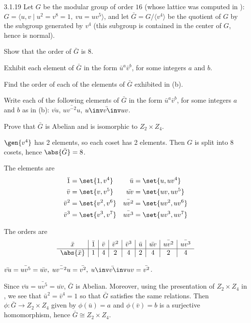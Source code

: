 \begin{exercise}{3.1.19}
    Let $G$ be the modular group of order $16$ (whose lattice was computed in ): $G = \langle u,v \mid u^2 = v^8 = 1,\ vu = uv^5 \rangle$, and let $\bar{G} = G/\langle v^4 \rangle$ be the quotient of $G$ by the subgroup generated by $v^4$ (this subgroup is contained in the center of $G$, hence is normal).
    \begin{subexercises}
        \item Show that the order of $\bar{G}$ is $8$.
        \item Exhibit each element of $\bar{G}$ in the form $\bar{u}^a \bar{v}^b$, for some integers $a$ and $b$.
        \item Find the order of each of the elements of $\bar{G}$ exhibited in (b).
        \item Write each of the following elements of $\bar{G}$ in the form $\bar{u}^a \bar{v}^b$, for some integers $a$ and $b$ as in (b): $\bar{vu}$, $\bar{uv^{-2}u}$, $\bar{u\inv v\inv uv}$.
        \item Prove that $\bar{G}$ is Abelian and is isomorphic to $Z_2 \times Z_4$.
    \end{subexercises}
\end{exercise}

\begin{solenum}
    \item $\gen{v^4}$ has 2 elements, so each coset has 2 elements.
	Then $G$ is split into 8 cosets, hence $\abs{\bar G} = 8$.
    \item The elements are
    \begin{align*}
        \bar 1 & = \set{1, v^4} & \bar u & = \set{u, uv^4} \\
        \bar v & = \set{v, v^5} & \bar{uv} & = \set{uv, uv^5} \\
        \bar v^2 & = \set{v^2, v^6} & \bar{uv^2} & = \set{uv^2, uv^6} \\
        \bar v^3 & = \set{v^3, v^7} & \bar{uv^3} & = \set{uv^3, uv^7}
    \end{align*}
    \item The orders are
    \[
        \begin{array}{c|c|c|c|c|c|c|c|c}
            \bar x & \bar 1 & \bar v & \bar v^2 & \bar v^3 & \bar u & \bar{uv} & \bar{uv^2} & \bar{uv^3} \\
            \hline
            \abs{\bar x} & 1 & 4 & 2 & 4 & 2 & 4 & 2 & 4
        \end{array}
    \]
    \item $\bar{vu} = \bar{uv^5} = \bar{uv},\; \bar{uv^{-2}u} = \bar{v^2},\; \bar{u\inv v\inv uv} = \bar{v^2}$.
    \item Since $\bar{vu} = \bar{uv^5} = \bar{uv}$, $\bar G$ is Abelian.
	Moreover, using the presentation of $Z_2 \times Z_4$ in , we see that $\bar u^2 = \bar v^4 = 1$ so that $\bar G$ satisfies the same relations.
	Then $\phi : \bar G \to Z_2 \times Z_4$ given by $\phi(\bar u) = a$ and $\phi(\bar v) = b$ is a surjective homomorphism, hence $\bar G \cong Z_2 \times Z_4$.
\end{solenum}

